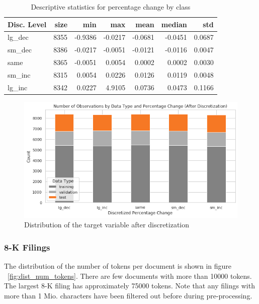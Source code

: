 \documentclass{article}
\begin{document}
	\begin{table}[h!]
		\centering
		\caption{Descriptive statistics for percentage change by class}
		\label{table:stats_by_target}
	
		\begin{tabular}{lrrrrrr}
			\toprule
			Disc. Level &  size &     min &     max &    mean &  median &     std \\
			\midrule
			lg\_dec &  8355 & -0.9386 & -0.0217 & -0.0681 & -0.0451 &  0.0687 \\
			sm\_dec &  8386 & -0.0217 & -0.0051 & -0.0121 & -0.0116 &  0.0047 \\
			same   &  8365 & -0.0051 &  0.0054 &  0.0002 &  0.0002 &  0.0030 \\
			sm\_inc &  8315 &  0.0054 &  0.0226 &  0.0126 &  0.0119 &  0.0048 \\
			lg\_inc &  8342 &  0.0227 &  4.9105 &  0.0736 &  0.0473 &  0.1166 \\
			\bottomrule
		\end{tabular}
	\end{table}%


	\begin{figure}[h!]
	\includegraphics[width=\linewidth]{img/dist_target_disc.png}
	\caption{Distribution of the target variable after discretization}
	\label{fig:dist_target_disc}
	\end{figure}


	\subsubsection{8-K Filings}
	
	The distribution of the number of tokens per document is shown in figure ~\ref{fig:dist_num_tokens}. There are few documents with more than 10000 tokens. The largest 8-K filing has approximately 75000 tokens. Note that any filings with more than 1 Mio. characters have been filtered out before during pre-processing.
\end{document}
